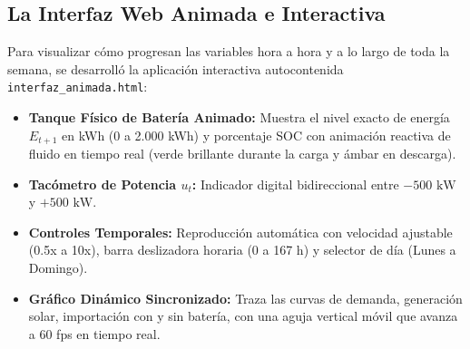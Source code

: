 \documentclass[a4paper,11pt]{article}
\begin{document}
\subsection{La Interfaz Web Animada e Interactiva}
Para visualizar cómo progresan las variables hora a hora y a lo largo de toda la semana, se desarrolló la aplicación interactiva autocontenida \texttt{interfaz\_animada.html}:
\begin{itemize}
    \item \textbf{Tanque Físico de Batería Animado:} Muestra el nivel exacto de energía $E_{t+1}$ en kWh (0 a 2.000 kWh) y porcentaje SOC con animación reactiva de fluido en tiempo real (verde brillante durante la carga y ámbar en descarga).
    \item \textbf{Tacómetro de Potencia $u_t$:} Indicador digital bidireccional entre $-500\text{ kW}$ y $+500\text{ kW}$.
    \item \textbf{Controles Temporales:} Reproducción automática con velocidad ajustable (0.5x a 10x), barra deslizadora horaria (0 a 167 h) y selector de día (Lunes a Domingo).
    \item \textbf{Gráfico Dinámico Sincronizado:} Traza las curvas de demanda, generación solar, importación con y sin batería, con una aguja vertical móvil que avanza a 60 fps en tiempo real.
\end{itemize}
\end{document}
